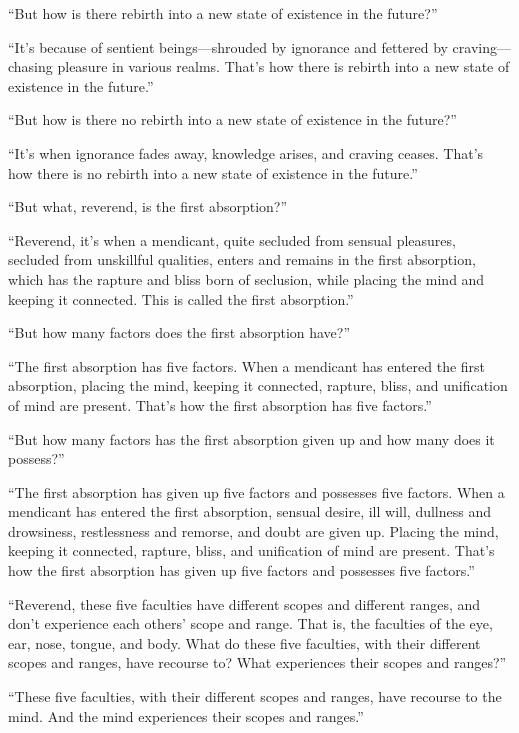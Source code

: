 \documentclass[12pt,openany]{book}%
\begin{document}
“But how is there rebirth into a new state of existence in the future?” 

“It’s because of sentient beings—shrouded by ignorance and fettered by craving—chasing pleasure in various realms. That’s how there is rebirth into a new state of existence in the future.” 

“But how is there no rebirth into a new state of existence in the future?” 

“It’s when ignorance fades away, knowledge arises, and craving ceases. That’s how there is no rebirth into a new state of existence in the future.” 

“But what, reverend, is the first absorption?” 

“Reverend, it’s when a mendicant, quite secluded from sensual pleasures, secluded from unskillful qualities, enters and remains in the first absorption, which has the rapture and bliss born of seclusion, while placing the mind and keeping it connected. This is called the first absorption.” 

“But how many factors does the first absorption have?” 

“The first absorption has five factors. When a mendicant has entered the first absorption, placing the mind, keeping it connected, rapture, bliss, and unification of mind are present. That’s how the first absorption has five factors.” 

“But how many factors has the first absorption given up and how many does it possess?” 

“The first absorption has given up five factors and possesses five factors. When a mendicant has entered the first absorption, sensual desire, ill will, dullness and drowsiness, restlessness and remorse, and doubt are given up. Placing the mind, keeping it connected, rapture, bliss, and unification of mind are present. That’s how the first absorption has given up five factors and possesses five factors.” 

“Reverend, these five faculties have different scopes and different ranges, and don’t experience each others’ scope and range. That is, the faculties of the eye, ear, nose, tongue, and body. What do these five faculties, with their different scopes and ranges, have recourse to? What experiences their scopes and ranges?” 

“These five faculties, with their different scopes and ranges, have recourse to the mind. And the mind experiences their scopes and ranges.” 
\end{document}
